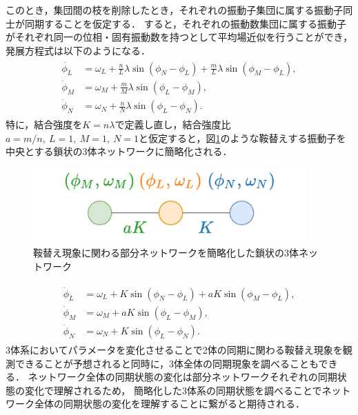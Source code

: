 \documentclass[../main]{subfiles}
\begin{document}
このとき，集団間の枝を削除したとき，それぞれの振動子集団に属する振動子同士が同期することを仮定する．
すると，それぞれの振動数集団に属する振動子がそれぞれ同一の位相・固有振動数を持つとして平均場近似を行うことができ，発展方程式は以下のようになる．
\begin{align}
    \label{eq:3body-default}
    \begin{split}
        \dot{\phi_L}&=\omega_L+\frac{n}{L}\lambda\sin\left( \phi_N-\phi_L \right)+\frac{m}{L}\lambda\sin\left( \phi_M-\phi_L \right),\\
        \dot{\phi}_M&=\omega_M+\frac{m}{M}\lambda\sin\left( \phi_L-\phi_M \right), \\
        \dot{\phi}_N&=\omega_N+\frac{n}{N}\lambda\sin\left( \phi_L-\phi_N \right).    
    \end{split}
\end{align}
特に，結合強度を$K=n\lambda$で定義し直し，結合強度比$a=m/n,\ L=1,\ M=1,\ N=1$と仮定すると，図\ref{fig:3body}のような鞍替えする振動子を中央とする鎖状の3体ネットワークに簡略化される．

\begin{figure}[tbp]
    \centering
    \includegraphics[width=105mm]{./images/three_obj_after.pdf}
    \centering
    \caption{鞍替え現象に関わる部分ネットワークを簡略化した鎖状の3体ネットワーク}
    \label{fig:3body}
\end{figure}

\begin{align}
    \label{eq:3body}
    \begin{split}
        \dot{\phi}_L&=\omega_L+K\sin\left( \phi_N-\phi_L \right)+aK\sin\left( \phi_M-\phi_L \right),\\
        \dot{\phi}_M&=\omega_M+aK\sin\left( \phi_L-\phi_M \right), \\
        \dot{\phi}_N&=\omega_N+K\sin\left( \phi_L-\phi_N \right).    
    \end{split}
\end{align}
3体系においてパラメータを変化させることで2体の同期に関わる鞍替え現象を観測できることが予想されると同時に，3体全体の同期現象を調べることもできる．
ネットワーク全体の同期状態の変化は部分ネットワークそれぞれの同期状態の変化で理解されるため，
簡略化した3体系の同期状態を調べることでネットワーク全体の同期状態の変化を理解することに繋がると期待される．
\end{document}
